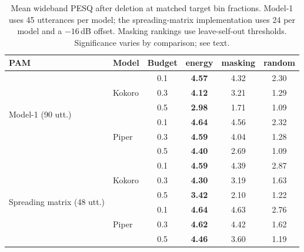 \documentclass[11pt,a4paper]{article}
\begin{document}
\begin{table}[htbp]
\centering
\caption{Mean wideband PESQ after deletion at matched target bin fractions. Model-1 uses 45 utterances per model; the spreading-matrix implementation uses 24 per model and a $-16$\,dB offset. Masking rankings use leave-self-out thresholds. Significance varies by comparison; see text.}
\label{tab:h3}
\small
\begin{tabular}{@{}llcccc@{}}
\toprule
\textbf{PAM} & \textbf{Model} & \textbf{Budget} & \textbf{energy} & \textbf{masking} & \textbf{random} \\
\midrule
\multirow{6}{*}{Model-1 (90 utt.)} & \multirow{3}{*}{Kokoro} & 0.1 & \textbf{4.57} & 4.32 & 2.30 \\
 & & 0.3 & \textbf{4.12} & 3.21 & 1.29 \\
 & & 0.5 & \textbf{2.98} & 1.71 & 1.09 \\
 & \multirow{3}{*}{Piper} & 0.1 & \textbf{4.64} & 4.56 & 2.32 \\
 & & 0.3 & \textbf{4.59} & 4.04 & 1.28 \\
 & & 0.5 & \textbf{4.40} & 2.69 & 1.09 \\
\midrule
\multirow{6}{*}{Spreading matrix (48 utt.)} & \multirow{3}{*}{Kokoro} & 0.1 & \textbf{4.59} & 4.39 & 2.87 \\
 & & 0.3 & \textbf{4.30} & 3.19 & 1.63 \\
 & & 0.5 & \textbf{3.42} & 2.10 & 1.22 \\
 & \multirow{3}{*}{Piper} & 0.1 & \textbf{4.64} & 4.63 & 2.76 \\
 & & 0.3 & \textbf{4.62} & 4.42 & 1.62 \\
 & & 0.5 & \textbf{4.46} & 3.60 & 1.19 \\
\bottomrule
\end{tabular}
\end{table}
\end{document}
